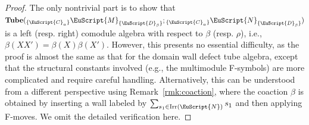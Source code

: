 \documentclass[a4paper,11pt]{article}
\theoremstyle{definition}
\theoremstyle{remark}
\newcommand\eC           {\EuScript{C}}
\newcommand\eD           {\EuScript{D}}
\newcommand\eM          {\EuScript{M}}
\newcommand\eN         {\EuScript{N}}
\newcommand{\Irr}{\operatorname{Irr}}
\begin{document}
\begin{proof}
    The only nontrivial part is to show that $\mathbf{Tube}({_{\{\eC_{\alpha}\}}} \eM_{\{\eD_{\beta}\}};{_{\{\eC_{\alpha}\}}} \eN_{\{\eD_{\beta}\}})$ is a left (resp. right) comodule algebra with respect to $\beta$ (resp. $\rho$), i.e., $\beta(XX')=\beta(X)\beta(X')$. However, this presents no essential difficulty, as the proof is almost the same as that for the domain wall defect tube algebra, except that the structural constants involved (e.g., the multimodule F-symbols) are more complicated and require careful handling.  
    Alternatively, this can be understood from a different perspective using Remark~\ref{rmk:coaction}, where the coaction $\beta$ is obtained by inserting  a wall labeled by $\sum_{s_1\in \Irr(\eN)}s_1$ and then applying F-moves. We omit the detailed verification here. 
\end{proof}
\end{document}
